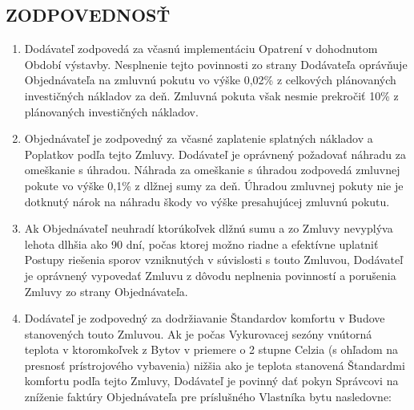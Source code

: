 \begin{multicols}{2}
\subsection{ZODPOVEDNOSŤ}

\begin{enumerate}
\def\labelenumi{\arabic{enumi}.}
\item
  Dodávateľ zodpovedá za včasnú implementáciu Opatrení v dohodnutom
  Období výstavby. Nesplnenie tejto povinnosti zo strany Dodávateľa
  oprávňuje Objednávateľa na zmluvnú pokutu vo výške 0,02\% z celkových
  plánovaných investičných nákladov za deň. Zmluvná pokuta však nesmie
  prekročiť 10\% z plánovaných investičných nákladov.
\item
  Objednávateľ je zodpovedný za včasné zaplatenie splatných nákladov a
  Poplatkov podľa tejto Zmluvy. Dodávateľ je oprávnený požadovať náhradu
  za omeškanie s úhradou. Náhrada za omeškanie s úhradou zodpovedá
  zmluvnej pokute vo výške 0,1\% z dlžnej sumy za deň. Úhradou zmluvnej
  pokuty nie je dotknutý nárok na náhradu škody vo výške presahujúcej
  zmluvnú pokutu.
\item
  Ak Objednávateľ neuhradí ktorúkoľvek dlžnú sumu a zo Zmluvy nevyplýva
  lehota dlhšia ako 90 dní, počas ktorej možno riadne a efektívne
  uplatniť Postupy riešenia sporov vzniknutých v súvislosti s touto
  Zmluvou, Dodávateľ je oprávnený vypovedať Zmluvu z dôvodu neplnenia
  povinností a porušenia Zmluvy zo strany Objednávateľa.
\item
  Dodávateľ je zodpovedný za dodržiavanie Štandardov komfortu v Budove
  stanovených touto Zmluvou. Ak je počas Vykurovacej sezóny vnútorná
  teplota v ktoromkoľvek z Bytov v priemere o 2 stupne Celzia (s ohľadom
  na presnosť prístrojového vybavenia) nižšia ako je teplota stanovená
  Štandardmi komfortu podľa tejto Zmluvy, Dodávateľ je povinný dať pokyn
  Správcovi na zníženie faktúry Objednávateľa pre príslušného Vlastníka
  bytu nasledovne:


\end{enumerate}
\end{multicols}
